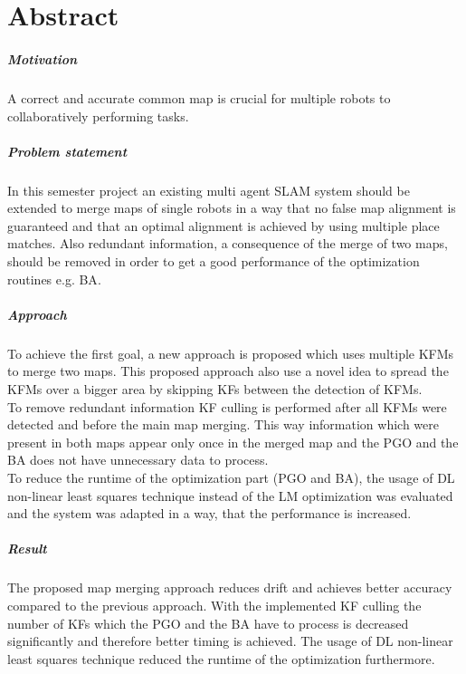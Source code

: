 \chapter*{Abstract}

\paragraph*{Motivation}
A correct and accurate common map is crucial for multiple robots to collaboratively performing tasks. 

\paragraph*{Problem statement}
In this semester project an existing multi agent \ac{SLAM} system should be extended to merge maps of single robots in a way that no false map alignment is guaranteed and that an optimal alignment is achieved by using multiple place matches. Also redundant information, a consequence of the merge of two maps, should be removed in order to get a good performance of the optimization routines e.g. \ac{BA}.

\paragraph*{Approach}
To achieve the first goal, a new approach is proposed which uses multiple \acfp{KFM} to merge two maps. This proposed approach also use a novel idea to spread the \acp{KFM} over a bigger area by skipping \acfp{KF} between the detection of \acp{KFM}.\\
To remove redundant information \ac{KF} culling is performed after all \acp{KFM} were detected and before the main map merging. This way information which were present in both maps appear only once in the merged map and the \ac{PGO} and the \ac{BA} does not have unnecessary data to process.\\
To reduce the runtime of the optimization part (\ac{PGO} and \ac{BA}), the usage of \acf{DL} non-linear least squares technique instead of the \acf{LM} optimization was evaluated and the system was adapted in a way, that the performance is increased.


\paragraph*{Result}
The proposed map merging approach reduces drift and achieves better accuracy compared to the previous approach. With the implemented \ac{KF} culling the number of \acp{KF} which the \ac{PGO} and the \ac{BA} have to process is decreased significantly and therefore better timing is achieved. The usage of \ac{DL} non-linear least squares technique reduced the runtime of the optimization furthermore.
